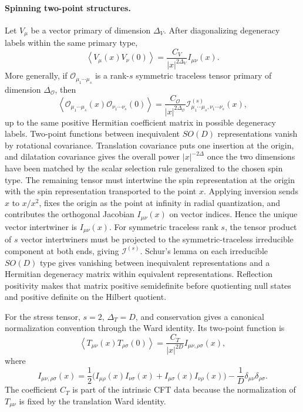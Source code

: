 \paragraph{Spinning two-point structures.}
Let \(V_\mu\) be a vector primary of dimension \(\Delta_V\).  After
diagonalizing degeneracy labels within the same primary type,
\begin{equation}
  \left\langle V_\mu(x)V_\nu(0)\right\rangle
  =
  \frac{C_V}{|x|^{2\Delta_V}}I_{\mu\nu}(x).
  \label{eq:vector-primary-two-point}
\end{equation}
More generally, if
\(\mathcal O_{\mu_1\cdots\mu_s}\) is a rank-\(s\) symmetric traceless tensor
primary of dimension \(\Delta_{\mathcal O}\), then
\begin{equation}
  \left\langle
    \mathcal O_{\mu_1\cdots\mu_s}(x)
    \mathcal O_{\nu_1\cdots\nu_s}(0)
  \right\rangle
  =
  \frac{C_{\mathcal O}}{|x|^{2\Delta_{\mathcal O}}}
  \mathcal I^{(s)}_{\mu_1\cdots\mu_s,\nu_1\cdots\nu_s}(x),
  \label{eq:stt-primary-two-point}
\end{equation}
up to the same positive Hermitian coefficient matrix in possible degeneracy
labels.  Two-point functions between inequivalent \(SO(D)\) representations
vanish by rotational covariance.
Translation covariance puts one insertion at the origin, and dilatation
covariance gives the overall power \(|x|^{-2\Delta}\) once the two
dimensions have been matched by the scalar selection rule generalized to the
chosen spin type.  The remaining tensor must intertwine the spin
representation at the origin with the spin representation transported to the
point \(x\).  Applying inversion sends \(x\) to \(x/x^2\), fixes the origin as
the point at infinity in radial quantization, and contributes the orthogonal
Jacobian \(I_{\mu\nu}(x)\) on vector indices.  Hence the unique vector
intertwiner is \(I_{\mu\nu}(x)\).  For symmetric traceless rank \(s\), the
tensor product of \(s\) vector intertwiners must be projected to the
symmetric-traceless irreducible component at both ends, giving
\(\mathcal I^{(s)}\).  Schur's lemma on each irreducible \(SO(D)\) type gives
vanishing between inequivalent representations and a Hermitian degeneracy
matrix within equivalent representations.  Reflection positivity makes that
matrix positive semidefinite before quotienting null states and positive
definite on the Hilbert quotient.

For the stress tensor, \(s=2\), \(\Delta_T=D\), and conservation gives a
canonical normalization convention through the Ward identity.  Its two-point
function is
\begin{equation}
  \left\langle T_{\mu\nu}(x)T_{\rho\sigma}(0)\right\rangle
  =
  \frac{C_T}{|x|^{2D}}
  I_{\mu\nu,\rho\sigma}(x),
  \label{eq:stress-tensor-two-point}
\end{equation}
where
\[
  I_{\mu\nu,\rho\sigma}(x)
  =
  \frac12\bigl(
    I_{\mu\rho}(x)I_{\nu\sigma}(x)
    +
    I_{\mu\sigma}(x)I_{\nu\rho}(x)
  \bigr)
  -
  \frac1D\delta_{\mu\nu}\delta_{\rho\sigma}.
\]
The coefficient \(C_T\) is part of the intrinsic CFT data because the
normalization of \(T_{\mu\nu}\) is fixed by the translation Ward identity.

